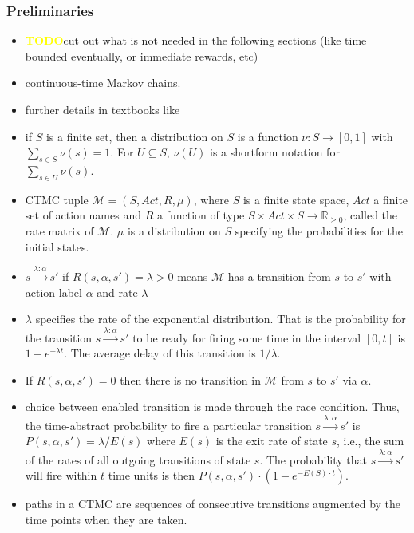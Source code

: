 \documentclass[a4paper, 10pt]{article}
\def \todo{\textbf{\textcolor{yellow}{TODO}}}
\begin{document}
\subsubsection{Preliminaries}
\label{sssec:analysis-modelchecking-preliminaries}
\begin{itemize}
	\item \todo cut out what is not needed in the following sections (like time bounded eventually, or immediate rewards, etc)
	\item continuous-time Markov chains.
	\item further details in textbooks like \cite{kul95, ks76}
	\item if $S$ is a finite set, then a distribution on $S$ is a function $\nu:S \rightarrow [0,1]$ with $\sum\limits_{s \in S} \nu (s) = 1$. For $U \subseteq S$, $\nu (U)$ is a shortform notation for $\sum\limits_{s \in U} \nu (s)$.
	\item CTMC tuple $\mathcal{M} = (S, \mathit{Act}, R, \mu)$, where $S$ is a finite state space, $Act$ a finite set of action names and $R$ a function of type $S \times \mathit{Act} \times S \rightarrow \mathbb{R}_{\ge 0}$, called the rate matrix of $\mathcal{M}$. $\mu$ is a distribution on $S$ specifying the probabilities for the initial states.
	\item $s \xrightarrow{\lambda : \alpha} s'$ if $R(s, \alpha, s') = \lambda > 0$ means $\mathcal{M}$ has a transition from $s$ to $s'$ with action label $\alpha$ and rate $\lambda$
	\item $\lambda$ specifies the rate of the exponential distribution. That is the probability for the transition $s \xrightarrow{\lambda : \alpha} s'$ to be ready for firing some time in the interval $[0,t]$ is $1-e^{- \lambda t}$. The average delay  of this transition is $1 / \lambda$.
	\item If $R(s, \alpha, s') = 0$ then there is no transition in $\mathcal{M}$ from $s$ to $s'$ via $\alpha$.
	\item choice between enabled transition is made through the race condition. Thus, the time-abstract probability to fire a particular transition $s \xrightarrow{\lambda : \alpha} s'$ is $P(s, \alpha, s') = \lambda / E(s)$ where $E(s)$ is the exit rate of state $s$, i.e., the sum of the rates of all outgoing transitions of state $s$. The probability that $s \xrightarrow{\lambda : \alpha} s'$ will fire within $t$ time units is then $P(s, \alpha, s') \cdot (1 - e^{- E(S) \cdot t})$.
	\item paths in a CTMC are sequences of consecutive transitions augmented by the time points when they are taken.

\end{itemize}
\end{document}

